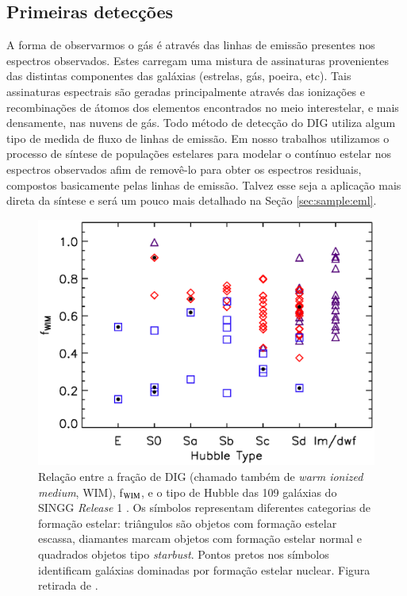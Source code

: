 \subsection{Primeiras detecções}
\label{sec:intro:DIG:first}

A forma de observarmos o gás é através das linhas de emissão presentes nos espectros observados. Estes carregam uma mistura de assinaturas provenientes das distintas componentes das galáxias (estrelas, gás, poeira, etc). Tais assinaturas espectrais são geradas principalmente através das ionizações e recombinações de átomos dos elementos encontrados no meio interestelar, e mais densamente, nas nuvens de gás. Todo método de detecção do DIG utiliza algum tipo de medida de fluxo de linhas de emissão. Em nosso trabalhos utilizamos o processo de síntese de populações estelares para modelar o contínuo estelar nos espectros observados afim de removê-lo para obter os espectros residuais, compostos basicamente pelas linhas de emissão. Talvez esse seja a aplicação mais direta da síntese e será um pouco mais detalhado na Seção \ref{sec:sample:eml}.

\begin{figure}
	\centering
	\includegraphics[scale=0.7]{figuras/Oey_etal_2007_f8.eps}
	\caption[SINGG: f$_{\rm WIM} \times$ tipo de Hubble]
	{Relação entre a fração de DIG (chamado também de {\em warm ionized medium}, WIM), f$_{\rm WIM}$, e o tipo de Hubble das 109 galáxias do SINGG {\em Release} 1 \citep[SR1][]{Meurer.etal.2006}. Os símbolos representam diferentes categorias de formação estelar: triângulos são objetos com formação estelar escassa, diamantes marcam objetos com formação estelar normal e quadrados objetos tipo {\em starbust}. Pontos pretos nos símbolos identificam galáxias dominadas por formação estelar nuclear. Figura retirada de \citet{Oey.etal.2007}.}
	\label{fig:Oey_f8}
\end{figure}

